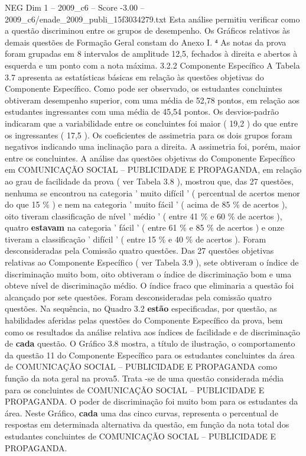 \begin{textsample}{NEG Dim 1 – 2009\_c6 – Score -3.00 – 2009\_c6/enade\_2009\_publi\_15f3034279.txt}
Esta análise permitiu verificar como a questão discriminou entre os grupos de desempenho.
Os Gráficos relativos às demais questões de Formação Geral constam do Anexo I. ⁴ As notas da prova foram grupadas em 8 intervalos de amplitude 12,5, fechados à direita e abertos à esquerda e um ponto com a nota máxima. 3.2.2 Componente Específico A Tabela 3.7 apresenta as estatísticas básicas em relação às questões objetivas do Componente Específico.
Como pode ser observado, os estudantes concluintes obtiveram desempenho superior, com uma média de 52,78 pontos, em relação aos estudantes ingressantes com uma média de 45,54 pontos.
Os desvios-padrão indicaram que a variabilidade entre os concluintes foi maior ( 19,2 ) do que entre os ingressantes ( 17,5 ).
Os coeficientes de assimetria para os dois grupos foram negativos indicando uma inclinação para a direita.
A assimetria foi, porém, maior entre os concluintes.
A análise das questões objetivas do Componente Específico em COMUNICAÇÃO SOCIAL – PUBLICIDADE E PROPAGANDA, em relação ao grau de facilidade da prova ( ver Tabela 3.8 ), mostrou que, das 27 questões, nenhuma se encontrou na categoria ' muito difícil ' ( percentual de acertos menor do que 15 \% ) e nem na categoria ' muito fácil ' ( acima de 85 \% de acertos ), oito tiveram classificação de nível ' médio ' ( entre 41 \% e 60 \% de acertos ), quatro \textbf{estavam} na categoria ' fácil ' ( entre 61 \% e 85 \% de acertos ) e onze tiveram a classificação ' difícil ' ( entre 15 \% e 40 \% de acertos ).
Foram desconsideradas pela Comissão quatro questões.
Das 27 questões objetivas relativas ao Componente Específico ( ver Tabela 3.9 ), sete obtiveram o índice de discriminação muito bom, oito obtiveram o índice de discriminação bom e uma obteve nível de discriminação médio.
O índice fraco que eliminaria a questão foi alcançado por sete questões.
Foram desconsideradas pela comissão quatro questões.
Na sequência, no Quadro 3.2 \textbf{estão} especificadas, por questão, as habilidades aferidas pelas questões do Componente Específico da prova, bem como os resultados da análise relativa aos índices de facilidade e de discriminação de \textbf{cada} questão.
O Gráfico 3.8 mostra, a título de ilustração, o comportamento da questão 11 do Componente Específico para os estudantes concluintes da área de COMUNICAÇÃO SOCIAL – PUBLICIDADE E PROPAGANDA como função da nota geral na prova5.
Trata -se de uma questão considerada média para os concluintes de COMUNICAÇÃO SOCIAL – PUBLICIDADE E PROPAGANDA.
O poder de discriminação foi muito bom para os estudantes da área.
Neste Gráfico, \textbf{cada} uma das cinco curvas, representa o percentual de respostas em determinada alternativa da questão, em função da nota total dos estudantes concluintes de COMUNICAÇÃO SOCIAL – PUBLICIDADE E PROPAGANDA.

\end{textsample}
